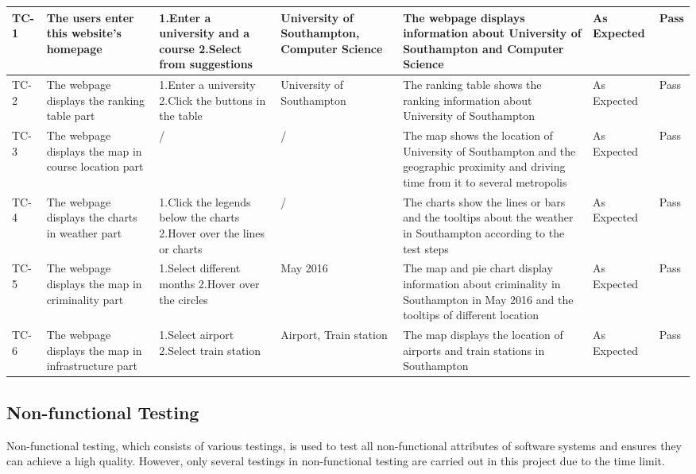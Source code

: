\begin{landscape}
\begin{center}
\begin{longtable}{|p{1cm}|p{3.5cm}|p{4cm}|p{3cm}|p{5cm}|p{2.5cm}|p{1cm}|}
TC-1 & The users enter this website’s homepage & 1.Enter a university and a course \newline 2.Select from suggestions
 & University of Southampton, Computer Science & The webpage displays information about University of Southampton and Computer Science & As Expected & Pass \\ \hline
TC-2 &  The webpage displays the ranking table part & 1.Enter a university  \newline
2.Click the buttons in the table & University of Southampton & The ranking table shows the ranking information about University of Southampton & As Expected & Pass \\ \hline
TC-3 & The webpage displays the map in course location part & / & / & The map shows the location of University of Southampton and the geographic proximity and driving time from it to several metropolis & As Expected & Pass \\ \hline
TC-4 & The webpage displays the charts in weather part & 1.Click the legends below the charts  \newline
2.Hover over the lines or charts & / & The charts show the lines or bars and the tooltips about the weather in Southampton according to the test steps  & As Expected & Pass \\ \hline
TC-5 & The webpage displays the map in criminality part & 1.Select different months  \newline
2.Hover over the circles  & May 2016 & The map and pie chart display information about criminality in Southampton in May 2016 and the tooltips of different location & As Expected & Pass \\ \hline
TC-6 & The webpage displays the map in infrastructure part & 1.Select airport  \newline 2.Select train station
 & Airport, Train station & The map displays the location of airports and train stations in Southampton & As Expected & Pass \\ \hline



\end{longtable}
\end{center}
\end{landscape}

\subsection{Non-functional Testing}

Non-functional testing, which consists of various testings, is used to test all non-functional attributes of software systems and ensures they can achieve a high quality. However, only several testings in non-functional testing are carried out in this project due to the time limit.   

